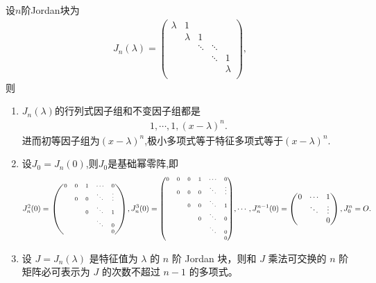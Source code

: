 \documentclass[../../main.tex]{subfiles}%
\begin{document}
\begin{proposition}[Jordan块的性质]\label{proposition:Jordan块的性质}
设$n$阶Jordan块为
\begin{align*}
J_n(\lambda)=\left( \begin{matrix}
\lambda&		1&		&		&		\\
&		\lambda&		1&		&		\\
&		&		\ddots&		\ddots&		\\
&		&		&		\ddots&		1\\
&		&		&		&		\lambda\\
\end{matrix} \right) ,
\end{align*}
则
\begin{enumerate}[(1)]
\item $J_n(\lambda)$的行列式因子组和不变因子组都是
\begin{align*}
1,\cdots,1,(x-\lambda)^n.
\end{align*}
进而初等因子组为$(x-\lambda)^n$,极小多项式等于特征多项式等于$(x-\lambda)^n$.

\item 设$J_0=J_n(0)$,则$J_0$是基础幂零阵,即
\begin{align*}
J_n^2(0)={\scriptsize \begin{pmatrix}
0 & 0 & 1 & \cdots & 0 \\
& 0 & 0 & \ddots & \vdots \\
& & 0 & \ddots & 1 \\
& & & \ddots & 0 \\
& & & & 0
\end{pmatrix}},J_n^3(0)={\scriptsize \begin{pmatrix}
0 & 0 & 0 & 1 & \cdots & 0 \\
& 0 & 0 & 0 & \ddots & \vdots \\
& & 0 & 0 & \ddots & 1 \\
& & & 0 & \ddots & 0 \\
& & & & \ddots & 0 \\
& & & & & 0
\end{pmatrix}},\cdots,J_n^{n - 1}(0)=\begin{pmatrix}
0 & \cdots & 1 \\
& \ddots & \vdots \\
& & 0
\end{pmatrix},J_0^n=O.
\end{align*}

\item 设 $J = J_n(\lambda)$ 是特征值为 $\lambda$ 的 $n$ 阶 Jordan 块，则和 $J$ 乘法可交换的 $n$ 阶矩阵必可表示为 $J$ 的次数不超过 $n - 1$ 的多项式。


\end{enumerate}
\end{proposition}
\end{document}

